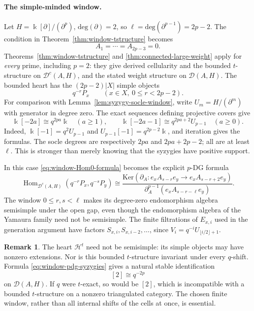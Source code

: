 \documentclass[11pt]{article}
\theoremstyle{definition}
\newtheorem{rem}[thm]{Remark}
\numberwithin{equation}{section}
\newcommand{\kk}{\Bbbk}
\newcommand{\Dc}{\mathcal{D}^c(A,H)}
\newcommand{\Hom}{\operatorname{Hom}}
\newcommand{\Der}{\mathcal{D}}
\newcommand{\Ke}{\mathrm{Ker}}
\begin{document}
\paragraph{The simple-minded window.}
Let $H=\kk[\partial]/(\partial^p)$, $\mathrm{deg}(\partial)=2$, so
$\ell=\mathrm{deg}(\partial^{p-1})=2p-2$.  The condition in Theorem~\ref{thm:window-tstructure}
becomes
\[
 A_1=\cdots=A_{2p-3}=0.
\]
Theorems~\ref{thm:window-tstructure} and
\ref{thm:connected-large-weight} apply for \emph{every} prime,
including $p=2$: they give derived cellularity and the bounded
$t$-structure on $\Dc$, and the stated weight structure on
$\Der(A,H)$.  The bounded heart has the
$(2p-2)|X|$ simple objects
\begin{equation}\label{eq:window-pdg-simples}
 q^{-r}P_x\qquad(x\in X,\ 0\le r<2p-2).
\end{equation}
For comparison with Lemma~\ref{lem:syzygy-socle-window}, write
$U_m=H/(\partial^m)$ with generator in degree zero.  The exact
sequences defining projective covers give
\begin{equation}\label{eq:window-pdg-syzygies}
\kk[-2a]\cong q^{2pa}\kk\quad(a\ge1),\qquad
\kk[-2a-1]\cong q^{2pa+2}U_{p-1}\quad(a\ge0).
\end{equation}
Indeed, $\kk[-1]=q^2U_{p-1}$ and
$ U_{p-1}[-1]=q^{2p-2}\kk$, and iteration gives the formulas.
The socle degrees are respectively $2pa$ and $2pa+2p-2$;
all are at least $\ell$.  This is stronger than merely knowing that
the syzygies have positive support.

In this case \eqref{eq:window-Hom0-formula} becomes the explicit
$p$-DG formula
\begin{equation}\label{eq:window-pdg-Hom0}
 \Hom_{\Dc}(q^{-r}P_x,q^{-s}P_y)
 \cong
 \frac{\Ke (\partial_A:e_xA_{s-r}e_y\to e_xA_{s-r+2}e_y)}
 {\partial_A^{p-1}(e_xA_{s-r-\ell}e_y)}.
\end{equation}
The window $0\le r,s<\ell$ makes its degree-zero endomorphism
algebra semisimple under the open gap, even though the endomorphism
algebra of the Yamaura family need not be semisimple.
The finite filtrations of $E_{x,i}$ used in the generation argument
have factors $S_{x,i},S_{x,i-2},\ldots$, since
$V_i=q^{-i}U_{\lfloor i/2\rfloor+1}$.

\begin{rem}
\label{rem:window-not-q-exact}
The heart $\mathcal{H}^t$ need not be semisimple: its simple objects
may have nonzero extensions.  Nor is this bounded $t$-structure
invariant under every $q$-shift.  Formula
\eqref{eq:window-pdg-syzygies} gives a natural stable identification
\begin{equation}\label{eq:window-pdg-periodicity}
 [2]\cong q^{-2p}
\end{equation}
on $\Der(A,H)$.  If $q$ were $t$-exact, so would be $[2]$,
which is incompatible with a bounded $t$-structure on a nonzero
triangulated category.  The chosen finite window, rather than all
internal shifts of the cells at once, is essential.
\end{rem}
\end{document}
